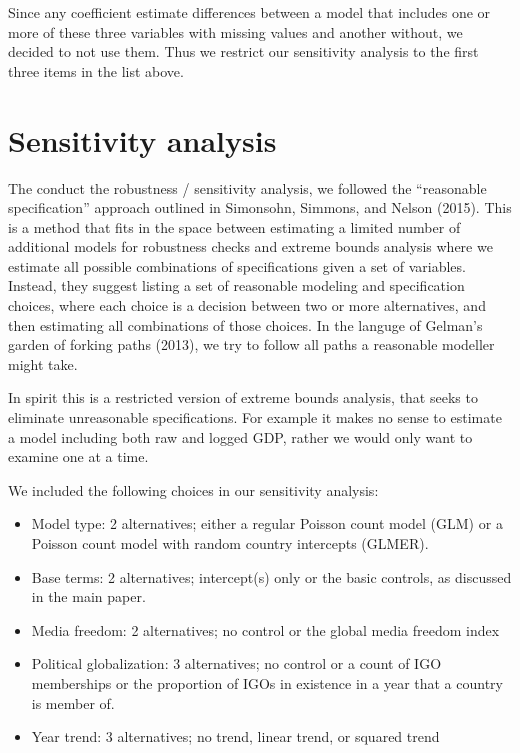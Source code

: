 \documentclass[]{article}
\providecommand{\tightlist}{%
  \setlength{\itemsep}{0pt}\setlength{\parskip}{0pt}}
\begin{document}
Since any coefficient estimate differences between a model that includes
one or more of these three variables with missing values and another
without, we decided to not use them. Thus we restrict our sensitivity
analysis to the first three items in the list above.

\hypertarget{sensitivity-analysis}{%
\section{Sensitivity analysis}\label{sensitivity-analysis}}

The conduct the robustness / sensitivity analysis, we followed the
``reasonable specification'' approach outlined in Simonsohn, Simmons,
and Nelson (2015). This is a method that fits in the space between
estimating a limited number of additional models for robustness checks
and extreme bounds analysis where we estimate all possible combinations
of specifications given a set of variables. Instead, they suggest
listing a set of reasonable modeling and specification choices, where
each choice is a decision between two or more alternatives, and then
estimating all combinations of those choices. In the languge of Gelman's
garden of forking paths (2013), we try to follow all paths a reasonable
modeller might take.

In spirit this is a restricted version of extreme bounds analysis, that
seeks to eliminate unreasonable specifications. For example it makes no
sense to estimate a model including both raw and logged GDP, rather we
would only want to examine one at a time.

We included the following choices in our sensitivity analysis:

\begin{itemize}
\tightlist
\item
  Model type: 2 alternatives; either a regular Poisson count model (GLM)
  or a Poisson count model with random country intercepts (GLMER).
\item
  Base terms: 2 alternatives; intercept(s) only or the basic controls,
  as discussed in the main paper.
\item
  Media freedom: 2 alternatives; no control or the global media freedom
  index
\item
  Political globalization: 3 alternatives; no control or a count of IGO
  memberships or the proportion of IGOs in existence in a year that a
  country is member of.
\item
  Year trend: 3 alternatives; no trend, linear trend, or squared trend
\end{itemize}
\end{document}
